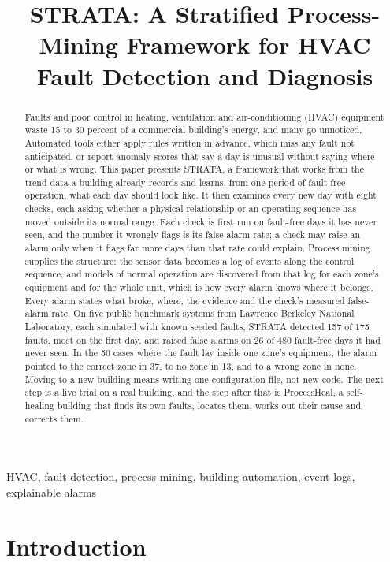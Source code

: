 \documentclass[conference]{IEEEtran}
\title{\fontsize{22}{26}\selectfont STRATA: A Stratified Process-Mining Framework for HVAC Fault Detection and Diagnosis}
\author{\IEEEauthorblockN{Yassh Singh}
\IEEEauthorblockA{Thompson Rivers University, Kamloops, Canada\\
Undergraduate Research Experience Award Program (U-REAP) 2026\\
Supervisors: Dr.\ Anthony Aighobahi and Dr.\ Mridula Sharma\\
singhy21@mytru.ca}}
\begin{document}
\maketitle

\begin{abstract}
Faults and poor control in heating, ventilation and air-conditioning (HVAC) equipment waste 15 to 30 percent of a commercial building's energy, and many go unnoticed. Automated tools either apply rules written in advance, which miss any fault not anticipated, or report anomaly scores that say a day is unusual without saying where or what is wrong. This paper presents STRATA, a framework that works from the trend data a building already records and learns, from one period of fault-free operation, what each day should look like. It then examines every new day with eight checks, each asking whether a physical relationship or an operating sequence has moved outside its normal range. Each check is first run on fault-free days it has never seen, and the number it wrongly flags is its false-alarm rate; a check may raise an alarm only when it flags far more days than that rate could explain. Process mining supplies the structure: the sensor data becomes a log of events along the control sequence, and models of normal operation are discovered from that log for each zone's equipment and for the whole unit, which is how every alarm knows where it belongs. Every alarm states what broke, where, the evidence and the check's measured false-alarm rate. On five public benchmark systems from Lawrence Berkeley National Laboratory, each simulated with known seeded faults, STRATA detected 157 of 175 faults, most on the first day, and raised false alarms on 26 of 480 fault-free days it had never seen. In the 50 cases where the fault lay inside one zone's equipment, the alarm pointed to the correct zone in 37, to no zone in 13, and to a wrong zone in none. Moving to a new building means writing one configuration file, not new code. The next step is a live trial on a real building, and the step after that is ProcessHeal, a self-healing building that finds its own faults, locates them, works out their cause and corrects them.
\end{abstract}

\begin{IEEEkeywords}
HVAC, fault detection, process mining, building automation, event logs, explainable alarms
\end{IEEEkeywords}

\section{Introduction}
\end{document}
